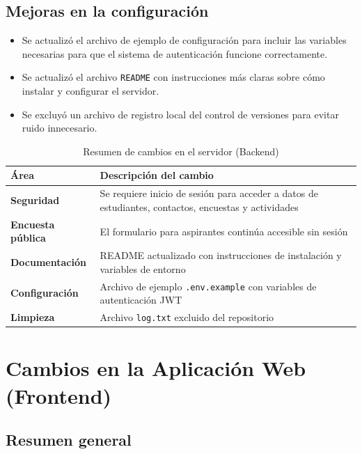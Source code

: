 \documentclass[12pt, a4paper]{article}
\begin{document}
\subsection{Mejoras en la configuración}

\begin{itemize}
  \item Se actualizó el archivo de ejemplo de configuración para incluir las variables necesarias para que el sistema de autenticación funcione correctamente.
  \item Se actualizó el archivo \texttt{README} con instrucciones más claras sobre cómo instalar y configurar el servidor.
  \item Se excluyó un archivo de registro local del control de versiones para evitar ruido innecesario.
\end{itemize}

\newpage
\begin{table}[H]
  \centering
  \caption{Resumen de cambios en el servidor (Backend)}
  \label{tab:backend-changes}
  \renewcommand{\arraystretch}{1.5}
  \begin{tabular}{>{\bfseries}p{4.2cm} p{9cm}}
    \toprule
    Área & Descripción del cambio \\
    \midrule
    Seguridad & Se requiere inicio de sesión para acceder a datos de estudiantes, contactos, encuestas y actividades \\[0.3em]
    Encuesta pública & El formulario para aspirantes continúa accesible sin sesión \\[0.3em]
    Documentación & README actualizado con instrucciones de instalación y variables de entorno \\[0.3em]
    Configuración & Archivo de ejemplo \texttt{.env.example} con variables de autenticación JWT \\[0.3em]
    Limpieza & Archivo \texttt{log.txt} excluido del repositorio \\
    \bottomrule
  \end{tabular}
\end{table}

\newpage
\section{Cambios en la Aplicación Web (Frontend)}

\subsection{Resumen general}
\end{document}
